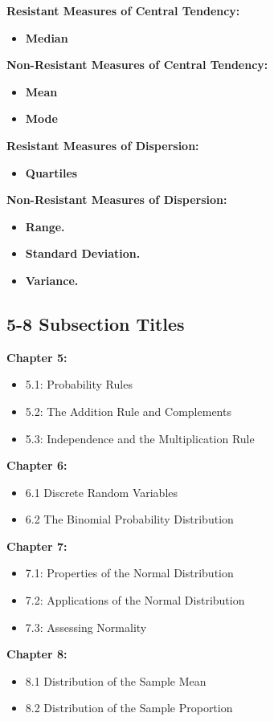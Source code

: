 \documentclass{report}
\begin{document}
       \bigbreak \noindent 
       \textbf{Resistant Measures of Central Tendency:}
       \begin{itemize}
           \item \textbf{Median}
       \end{itemize}
      \textbf{Non-Resistant Measures of Central Tendency:}
      \begin{itemize}
          \item \textbf{Mean}
          \item \textbf{Mode}
      \end{itemize}
      \bigbreak \noindent 
      \textbf{Resistant Measures of Dispersion:}
      \begin{itemize}
          \item \textbf{Quartiles}
      \end{itemize}
      \bigbreak \noindent 
    \textbf{Non-Resistant Measures of Dispersion:}
    \begin{itemize}
        \item \textbf{Range.}
        \item \textbf{Standard Deviation.}
        \item \textbf{Variance.}
    \end{itemize}

    \pagebreak 
    \subsection*{5-8 Subsection Titles}
    \bigbreak \noindent 
    \textbf{Chapter 5:}
    \begin{itemize}
      \item 5.1: Probability Rules
      \item 5.2: The Addition Rule and Complements
      \item 5.3: Independence and the Multiplication Rule
    \end{itemize}
    \bigbreak \noindent 
    \textbf{Chapter 6:}
    \begin{itemize}
      \item 6.1 Discrete Random Variables
      \item 6.2 The Binomial Probability Distribution
    \end{itemize}
    \bigbreak \noindent 
    \textbf{Chapter 7:}
    \begin{itemize}
      \item 7.1: Properties of the Normal Distribution
      \item 7.2: Applications of the Normal Distribution
      \item 7.3: Assessing Normality
    \end{itemize}
    \bigbreak \noindent 
    \textbf{Chapter 8:}
    \begin{itemize}
      \item 8.1 Distribution of the Sample Mean
      \item 8.2 Distribution of the Sample Proportion
    \end{itemize}
\end{document}
